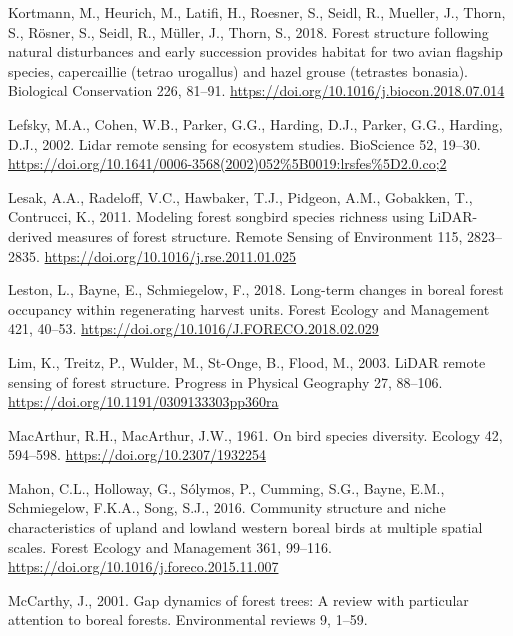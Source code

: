 \documentclass[
  12pt,
]{article}
\newlength{\cslhangindent}
\newlength{\cslentryspacingunit} %
\newenvironment{CSLReferences}[2] %
 {%
  \setlength{\parindent}{0pt}
  \ifodd #1
  \let\oldpar\par
  \def\par{\hangindent=\cslhangindent\oldpar}
  \fi
  \setlength{\parskip}{#2\cslentryspacingunit}
 }%
 {}
\begin{document}
\begin{CSLReferences}{1}{0}
\leavevmode{}%
Kortmann, M., Heurich, M., Latifi, H., Roesner, S., Seidl, R., Mueller, J., Thorn, S., Rösner, S., Seidl, R., Müller, J., Thorn, S., 2018. Forest structure following natural disturbances and early succession provides habitat for two avian flagship species, capercaillie (tetrao urogallus) and hazel grouse (tetrastes bonasia). Biological Conservation 226, 81--91. \url{https://doi.org/10.1016/j.biocon.2018.07.014}

\leavevmode{}%
Lefsky, M.A., Cohen, W.B., Parker, G.G., Harding, D.J., Parker, G.G., Harding, D.J., 2002. Lidar remote sensing for ecosystem studies. {BioScience} 52, 19--30. \url{https://doi.org/10.1641/0006-3568(2002)052\%5B0019:lrsfes\%5D2.0.co;2}

\leavevmode{}%
Lesak, A.A., Radeloff, V.C., Hawbaker, T.J., Pidgeon, A.M., Gobakken, T., Contrucci, K., 2011. Modeling forest songbird species richness using {LiDAR}-derived measures of forest structure. Remote Sensing of Environment 115, 2823--2835. \url{https://doi.org/10.1016/j.rse.2011.01.025}

\leavevmode{}%
Leston, L., Bayne, E., Schmiegelow, F., 2018. Long-term changes in boreal forest occupancy within regenerating harvest units. Forest Ecology and Management 421, 40--53. \url{https://doi.org/10.1016/J.FORECO.2018.02.029}

\leavevmode{}%
Lim, K., Treitz, P., Wulder, M., St-Onge, B., Flood, M., 2003. {LiDAR} remote sensing of forest structure. Progress in Physical Geography 27, 88--106. \url{https://doi.org/10.1191/0309133303pp360ra}

\leavevmode{}%
MacArthur, R.H., MacArthur, J.W., 1961. On bird species diversity. Ecology 42, 594--598. \url{https://doi.org/10.2307/1932254}

\leavevmode{}%
Mahon, C.L., Holloway, G., Sólymos, P., Cumming, S.G., Bayne, E.M., Schmiegelow, F.K.A., Song, S.J., 2016. Community structure and niche characteristics of upland and lowland western boreal birds at multiple spatial scales. Forest Ecology and Management 361, 99--116. \url{https://doi.org/10.1016/j.foreco.2015.11.007}

\leavevmode{}%
McCarthy, J., 2001. Gap dynamics of forest trees: A review with particular attention to boreal forests. Environmental reviews 9, 1--59.


\end{CSLReferences}
\end{document}

